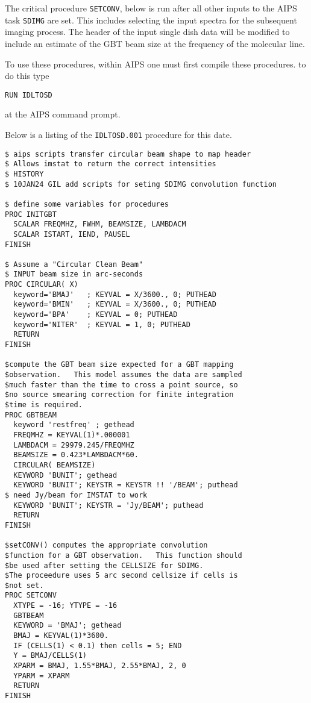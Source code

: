 \documentclass[12pt,twoside]{article}
\begin{document}
The critical procedure {\tt SETCONV}, below is run after all other inputs
to the AIPS task {\tt SDIMG} are set.   This includes selecting the input
spectra for the subsequent imaging process.   The header of the input
single dish data will be modified to include an estimate of the GBT beam size
at the frequency of the molecular line.

To use these procedures, within AIPS one must first compile these procedures.
to do this type 

{\tt RUN IDLTOSD}

at the AIPS command prompt.


Below is a listing of the {\tt IDLTOSD.001} procedure for this date.

\begin{verbatim}
$ aips scripts transfer circular beam shape to map header 
$ Allows imstat to return the correct intensities
$ HISTORY
$ 10JAN24 GIL add scripts for seting SDIMG convolution function

$ define some variables for procedures
PROC INITGBT
  SCALAR FREQMHZ, FWHM, BEAMSIZE, LAMBDACM
  SCALAR ISTART, IEND, PAUSEL
FINISH

$ Assume a "Circular Clean Beam"
$ INPUT beam size in arc-seconds
PROC CIRCULAR( X)
  keyword='BMAJ'   ; KEYVAL = X/3600., 0; PUTHEAD 
  keyword='BMIN'   ; KEYVAL = X/3600., 0; PUTHEAD 
  keyword='BPA'    ; KEYVAL = 0; PUTHEAD 
  keyword='NITER'  ; KEYVAL = 1, 0; PUTHEAD
  RETURN
FINISH

$compute the GBT beam size expected for a GBT mapping
$observation.   This model assumes the data are sampled
$much faster than the time to cross a point source, so
$no source smearing correction for finite integration
$time is required.
PROC GBTBEAM
  keyword 'restfreq' ; gethead
  FREQMHZ = KEYVAL(1)*.000001
  LAMBDACM = 29979.245/FREQMHZ
  BEAMSIZE = 0.423*LAMBDACM*60.
  CIRCULAR( BEAMSIZE)
  KEYWORD 'BUNIT'; gethead
  KEYWORD 'BUNIT'; KEYSTR = KEYSTR !! '/BEAM'; puthead
$ need Jy/beam for IMSTAT to work 
  KEYWORD 'BUNIT'; KEYSTR = 'Jy/BEAM'; puthead
  RETURN
FINISH

$setCONV() computes the appropriate convolution
$function for a GBT observation.   This function should
$be used after setting the CELLSIZE for SDIMG.
$The proceedure uses 5 arc second cellsize if cells is
$not set.
PROC SETCONV
  XTYPE = -16; YTYPE = -16
  GBTBEAM
  KEYWORD = 'BMAJ'; gethead
  BMAJ = KEYVAL(1)*3600.
  IF (CELLS(1) < 0.1) then cells = 5; END
  Y = BMAJ/CELLS(1) 
  XPARM = BMAJ, 1.55*BMAJ, 2.55*BMAJ, 2, 0
  YPARM = XPARM
  RETURN
FINISH
    

\end{verbatim}
\end{document}

